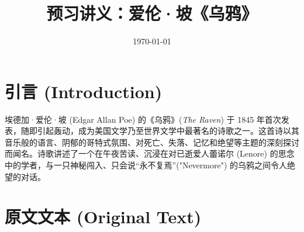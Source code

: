 \documentclass[12pt, a4paper]{article}
\title{\textbf{预习讲义：爱伦·坡《乌鸦》}}
\date{\today}
\begin{document}
\maketitle

\section{引言 (Introduction)}

埃德加·爱伦·坡 (Edgar Allan Poe) 的《乌鸦》(\textit{The Raven}) 于 1845 年首次发表，随即引起轰动，成为美国文学乃至世界文学中最著名的诗歌之一。这首诗以其音乐般的语言、阴郁的哥特式氛围、对死亡、失落、记忆和绝望等主题的深刻探讨而闻名。诗歌讲述了一个在午夜苦读、沉浸在对已逝爱人蕾诺尔 (Lenore) 的思念中的学者，与一只神秘闯入、只会说“永不复焉”("Nevermore") 的乌鸦之间令人绝望的对话。

\section{原文文本 (Original Text)}
\end{document}
